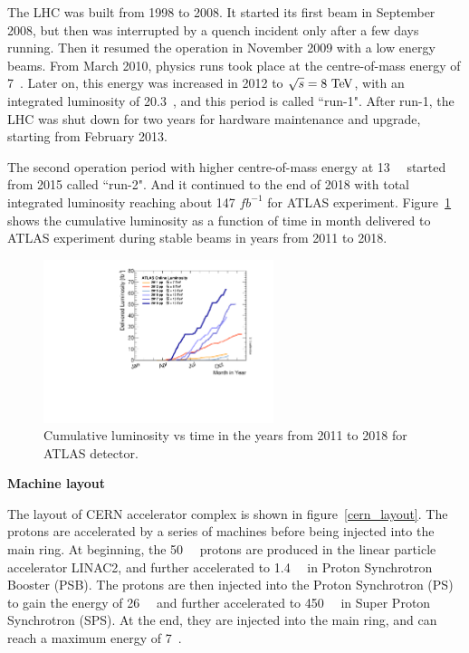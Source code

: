 The LHC was built from 1998 to 2008. 
It started its first beam in September 2008, but then was interrupted by a quench incident only after a few days running.
Then it resumed the operation in November 2009 with a low energy beams.
From March 2010, physics runs took place at the centre-of-mass energy of 7~\tev.
Later on, this energy was increased in 2012 to $\sqrt{s} = 8~\text{Te\kern -0.1em V}$, with an integrated luminosity of 20.3~\ifb, and this period is called ``run-1".
After run-1, the LHC was shut down for two years for hardware maintenance and upgrade, starting from February 2013.

The second operation period with higher centre-of-mass energy at 13~\tev~ started from 2015 called ``run-2".
And it continued to the end of 2018 with total integrated luminosity reaching about 147 $fb^{-1}$ for ATLAS experiment.
Figure~\ref{fig:lumi_vs_month} shows the cumulative luminosity as a function of time in month delivered to ATLAS experiment during stable beams 
in years from 2011 to 2018.
\begin{figure}[!htb]
  \centering
  \includegraphics[width=0.6\textwidth]{figures/Detector/intlumivsyear.pdf}
  \caption{Cumulative luminosity vs time in the years from 2011 to 2018 for ATLAS detector.}
  \label{fig:lumi_vs_month}
\end{figure}

\textbf{Machine layout}

The layout of CERN accelerator complex is shown in figure~\ref{cern_layout}.
The protons are accelerated by a series of machines before being injected into the main ring.
At beginning, the 50~\mev~ protons are produced in the linear particle accelerator LINAC2, 
and further accelerated to 1.4~\gev~ in Proton Synchrotron Booster (PSB).
The protons are then injected into the Proton Synchrotron (PS) to gain the energy of 26~\gev~ and further accelerated to 450~\gev~ in Super Proton Synchrotron (SPS).
At the end, they are injected into the main ring, and can reach a maximum energy of 7~\tev.

